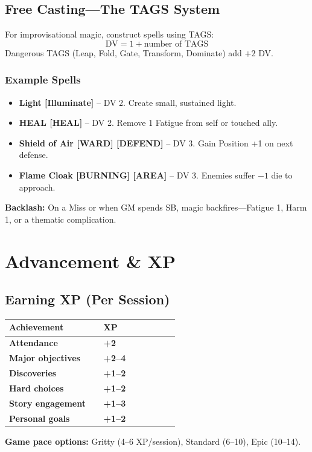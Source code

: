 \documentclass[10pt,twocolumn]{article} %
\begin{document}
\subsection{Free Casting—The TAGS System}
For improvisational magic, construct spells using TAGS:
\[
\text{DV} = 1 + \text{number of TAGS}
\]
Dangerous TAGS (Leap, Fold, Gate, Transform, Dominate) add $+2$ DV.

\subsubsection{Example Spells}
\begin{itemize}[leftmargin=*]
    \item \textbf{Light [Illuminate]} – DV 2. Create small, sustained light.
    \item \textbf{HEAL [HEAL]} – DV 2. Remove 1 Fatigue from self or touched ally.
    \item \textbf{Shield of Air [WARD] [DEFEND]} – DV 3. Gain Position +1 on next defense.
    \item \textbf{Flame Cloak [BURNING] [AREA]} – DV 3. Enemies suffer $-1$ die to approach.
\end{itemize}
\textbf{Backlash:} On a Miss or when GM spends SB, magic backfires—Fatigue 1, Harm 1, or a thematic complication.

\section{Advancement \& XP}

\subsection{Earning XP (Per Session)}
\begin{coretable}[XP Breakdown]
\begin{tabular}{>{\bfseries}p{0.5\linewidth} >{\bfseries}p{0.4\linewidth}}
\toprule
\textbf{Achievement} & \textbf{XP} \\
\midrule
Attendance & +2 \\
Major objectives & +2–4 \\
Discoveries & +1–2 \\
Hard choices & +1–2 \\
Story engagement & +1–3 \\
Personal goals & +1–2 \\
\bottomrule
\end{tabular}
\end{coretable}
\textbf{Game pace options:} Gritty (4–6 XP/session), Standard (6–10), Epic (10–14).
\end{document}
